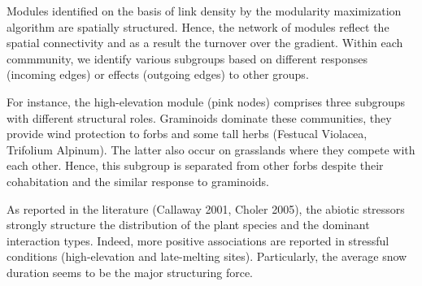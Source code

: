 \documentclass[]{article}
\begin{document}
Modules identified on the basis of link density by the modularity maximization algorithm are spatially structured. Hence, the network of modules reflect the spatial connectivity and as a result the turnover over the gradient. Within each commmunity, we identify various subgroups based on different responses (incoming edges) or effects (outgoing edges) to other groups. 

For instance, the high-elevation module (pink nodes) comprises three subgroups with different structural roles. Graminoids dominate these communities, they provide wind protection to forbs and some tall herbs (Festucal Violacea, Trifolium Alpinum). The latter also occur on grasslands where they compete with each other. Hence, this subgroup is separated from other forbs despite their cohabitation and the similar response to graminoids. 

As reported in the literature (Callaway 2001, Choler 2005), the abiotic stressors strongly structure the distribution of the plant species and the dominant interaction types. Indeed, more positive associations are reported in stressful conditions (high-elevation and late-melting sites). Particularly, the average snow duration seems to be the major structuring force. 
     
\end{document}
